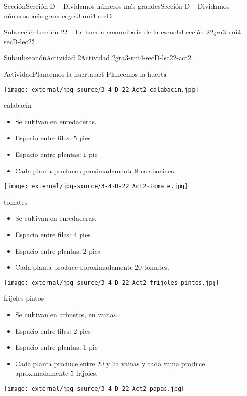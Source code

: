 \documentclass[twoside,14pt,]{extarticle}
\begin{document}
\begin{sectionptx}{Sección}{Sección D -~Dividamos números más grandes}{}{Sección D -~Dividamos números más grandes}{}{}{gra3-uni4-secD}
\begin{subsectionptx}{Subsección}{Lección 22 -~La huerta comunitaria de la escuela}{}{Lección 22}{}{}{gra3-uni4-secD-lec22}
\begin{subsubsectionptx}{Subsubsección}{Actividad 2}{}{Actividad 2}{}{}{gra3-uni4-secD-lec22-act2}
\begin{activity}{Actividad}{Planeemos la huerta.}{act-Planeemos-la-huerta}
\begin{sidebyside}{2}{0}{0}{0}
\begin{sbspanel}{0.5}
\texttt{[image: external/jpg-source/3-4-D-22 Act2-calabacin.jpg]}
%
\par
calabacín%
%
\begin{itemize}[label=\textbullet]
\item{}Se cultivan en enredaderas.%
\item{}Espacio entre filas: \(5\) pies%
\item{}Espacio entre plantas: \(1\) pie%
\item{}Cada planta produce aproximadamente \(8\) calabacines.%
\end{itemize}
\end{sbspanel}%
\begin{sbspanel}{0.5}%
\texttt{[image: external/jpg-source/3-4-D-22 Act2-tomate.jpg]}
%
\par
tomates%
%
\begin{itemize}[label=\textbullet]
\item{}Se cultivan en enredaderas.%
\item{}Espacio entre filas: \(4\) pies%
\item{}Espacio entre plantas: \(2\) pies%
\item{}Cada planta produce aproximadamente \(20\) tomates.%
\end{itemize}
\end{sbspanel}%
\end{sidebyside}%
\begin{sidebyside}{2}{0}{0}{0}%
\begin{sbspanel}{0.5}%
\texttt{[image: external/jpg-source/3-4-D-22 Act2-frijoles-pintos.jpg]}
%
\par
frijoles pintos%
%
\begin{itemize}[label=\textbullet]
\item{}Se cultivan en arbustos, en vainas.%
\item{}Espacio entre filas: \(2\) pies%
\item{}Espacio entre plantas: \(1\) pie%
\item{}Cada planta produce entre \(20\) y \(25\) vainas y cada vaina produce aproximadamente \(5\) frijoles.%
\end{itemize}
\end{sbspanel}%
\begin{sbspanel}{0.5}%
\texttt{[image: external/jpg-source/3-4-D-22 Act2-papas.jpg]}
%
\par

\end{sbspanel}
\end{sidebyside}
\end{activity}
\end{subsubsectionptx}
\end{subsectionptx}
\end{sectionptx}
\end{document}
